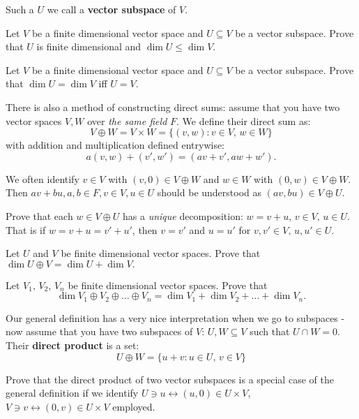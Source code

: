 Such a $U$ we call a \textbf{vector subspace} of $V$.

\begin{prob}
  Let $V$ be a finite dimensional vector space and $U\subseteq V$ be a vector subspace. Prove that $U$ is finite dimensional and $\dim U\le \dim V.$
\end{prob}

\begin{prob}
  Let $V$ be a finite dimensional vector space and $U\subseteq V$ be a vector subspace. Prove that $\dim U=\dim V$ iff $U=V$.
\end{prob}

There is also a method of constructing direct sums: assume that you have two vector spaces $V, W$ over \textit{the same field} $F$. We define their direct sum as:
$$V\oplus W=V\times W = \{(v,w) : v\in V,\, w\in W\}$$
with addition and multiplication defined entrywise:
$$a(v,w)+(v', w')=(av+v', aw+w').$$

We often identify $v\in V$ with $(v,0)\in V\oplus W$ and $w\in W$ with $(0,w)\in V\oplus W$. Then $av+bu, a,b\in F, v\in V, u\in U$ should be understood as $(av, bu)\in V\oplus U$.

\begin{prob}
  Prove that each $w\in V\oplus U$ has a \textit{unique} decomposition: $w=v+u,\, v\in V,\,u\in U$. That is if $w=v+u=v'+u'$, then $v=v'$ and $u=u'$ for $v,v'\in V,\, u,u'\in U$.
\end{prob}

\begin{prob}
  Let $U$ and $V$ be finite dimensional vector spaces. Prove that $\dim U\oplus V = \dim U + \dim V.$
\end{prob}

\begin{prob}
  Let $V_1, \,V_2,\, V_n$ be finite dimensional vector spaces. Prove that $$\dim V_1\oplus V_2\oplus\dots\oplus V_n=\dim V_1 + \dim V_2 + \dots + \dim V_n.$$
\end{prob}

Our general definition has a very nice interpretation when we go to subspaces -
now assume that you have two subspaces of $V$: $U,W\subseteq V$ such that $U\cap W=0$. Their \textbf{direct product} is a set:
$$U\oplus W =\{u+v : u\in U,\, v\in V\}$$

\begin{prob}
  Prove that the direct product of two vector subspaces is a special case of the general definition if we identify $U\ni u\leftrightarrow(u,0)\in U\times V$, $V\ni v\leftrightarrow (0,v)\in U\times V$ employed.
\end{prob}

